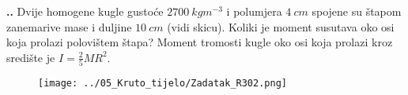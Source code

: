 
\noindent 
\textbf{
\thecjelina.\thezadatak.}
Dvije homogene kugle gustoće $2700\ kgm^{-3}$ i polumjera $4\ cm$ spojene su štapom zanemarive mase i duljine $10\ cm$ (vidi skicu).
Koliki je moment susutava oko osi koja prolazi polovištem štapa? Moment tromosti kugle oko osi koja prolazi kroz središte je $I=\frac{2}{5}MR^2$.
\begin{figure}[h]%
  \begin{center}
    \texttt{[image: ../05\_Kruto\_tijelo/Zadatak\_R302.png]}
  \end{center}
\end{figure}



